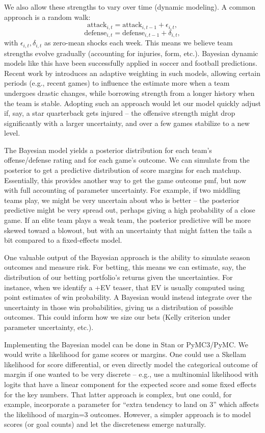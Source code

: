 \documentclass[11pt]{amsart}
\begin{document}
We also allow these strengths to vary over time (dynamic modeling). A common approach is a random walk:
\[ \text{attack}_{i,t} = \text{attack}_{i,t-1} + \epsilon_{i,t}, \]
\[ \text{defense}_{i,t} = \text{defense}_{i,t-1} + \delta_{i,t}, \]
with $\epsilon_{i,t}, \delta_{i,t}$ as zero-mean shocks each week. This means we believe team strengths evolve gradually (accounting for injuries, form, etc.). Bayesian dynamic models like this have been successfully applied in soccer and football predictions. Recent work by \citet{Macri2025} introduces an adaptive weighting in such models, allowing certain periods (e.g., recent games) to influence the estimate more when a team undergoes drastic changes, while borrowing strength from a longer history when the team is stable. Adopting such an approach would let our model quickly adjust if, say, a star quarterback gets injured – the offensive strength might drop significantly with a larger uncertainty, and over a few games stabilize to a new level.

The Bayesian model yields a posterior distribution for each team’s offense/defense rating and for each game’s outcome. We can simulate from the posterior to get a predictive distribution of score margins for each matchup. Essentially, this provides another way to get the game outcome pmf, but now with full accounting of parameter uncertainty. For example, if two middling teams play, we might be very uncertain about who is better – the posterior predictive might be very spread out, perhaps giving a high probability of a close game. If an elite team plays a weak team, the posterior predictive will be more skewed toward a blowout, but with an uncertainty that might fatten the tails a bit compared to a fixed-effects model.

One valuable output of the Bayesian approach is the ability to simulate season outcomes and measure risk. For betting, this means we can estimate, say, the distribution of our betting portfolio’s returns given the uncertainties. For instance, when we identify a +EV teaser, that EV is usually computed using point estimates of win probability. A Bayesian would instead integrate over the uncertainty in those win probabilities, giving us a distribution of possible outcomes. This could inform how we size our bets (Kelly criterion under parameter uncertainty, etc.).

Implementing the Bayesian model can be done in Stan or PyMC3/PyMC. We would write a likelihood for game scores or margins. One could use a Skellam likelihood for score differential, or even directly model the categorical outcome of margin if one wanted to be very discrete – e.g., use a multinomial likelihood with logits that have a linear component for the expected score and some fixed effects for the key numbers. That latter approach is complex, but one could, for example, incorporate a parameter for “extra tendency to land on 3” which affects the likelihood of margin=3 outcomes. However, a simpler approach is to model scores (or goal counts) and let the discreteness emerge naturally.
\end{document}
